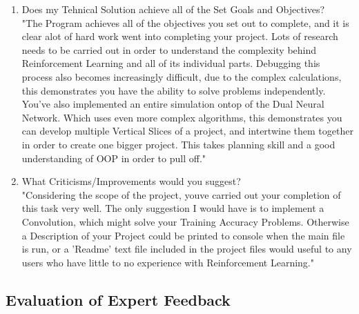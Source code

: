 \begin{flushleft}
\begin{enumerate}
            \item Does my Tehnical Solution achieve all of the Set Goals and Objectives? \\
                \vspace{0.2cm}
                "The Program achieves all of the objectives you set out to complete, and it is clear alot of hard work went into completing your
                project. Lots of research needs to be carried out in order to understand the complexity behind Reinforcement Learning and all
                of its individual parts. Debugging this process also becomes increasingly difficult, due to the complex calculations, this 
                demonstrates you have the ability to solve problems independently. \\
                \vspace{0.2cm}
                You've also implemented an entire simulation ontop of the Dual Neural Network. Which uses even more complex algorithms, this demonstrates
                you can develop multiple Vertical Slices of a project, and intertwine them together in order to create one bigger project. This
                takes planning skill and a good understanding of OOP in order to pull off." \\

                \vspace{0.5cm}
            \item What Criticisms/Improvements would you suggest? \\
                \vspace{0.2cm}
                "Considering the scope of the project, youve carried out your completion of this task very well. The only suggestion I would have is
                to implement a Convolution, which might solve your Training Accuracy Problems. Otherwise a Description of your Project could be
                printed to console when the main file is run, or a 'Readme' text file included in the project files would useful to any users who 
                have little to no experience with Reinforcement Learning." \\

                \vspace{0.5cm}
        \end{enumerate}


        \vspace{0.5cm}
    \subsection{Evaluation of Expert Feedback}
        \vspace{0.2cm}
        


\end{flushleft}
